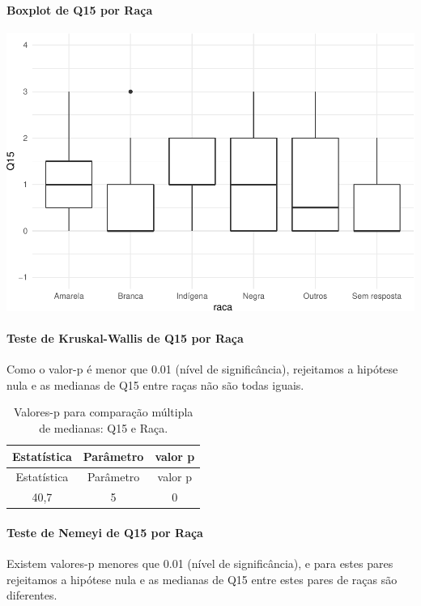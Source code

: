\documentclass[]{article}
\let\oldparagraph\paragraph
\renewcommand{\paragraph}[1]{\oldparagraph{#1}\mbox{}}
\begin{document}
\hypertarget{boxplot-de-q15-por-rauxe7a}{%
\paragraph{Boxplot de Q15 por Raça}\label{boxplot-de-q15-por-rauxe7a}}

\begin{center}\includegraphics[width=0.75\linewidth]{relatorio_covid19_files/figure-latex/unnamed-chunk-107-1} \end{center}

\hypertarget{teste-de-kruskal-wallis-de-q15-por-rauxe7a}{%
\paragraph{Teste de Kruskal-Wallis de Q15 por Raça}\label{teste-de-kruskal-wallis-de-q15-por-rauxe7a}}

Como o valor-p é menor que 0.01 (nível de significância), rejeitamos a hipótese nula e as medianas de Q15 entre raças não são todas iguais.

\begin{longtable}[]{@{}ccc@{}}
\caption{\label{tab:unnamed-chunk-109}Valores-p para comparação múltipla de medianas: Q15 e Raça.}\tabularnewline
\toprule
Estatística & Parâmetro & valor p\tabularnewline
\midrule
\endfirsthead
\toprule
Estatística & Parâmetro & valor p\tabularnewline
\midrule
\endhead
40,7 & 5 & 0\tabularnewline
\bottomrule
\end{longtable}

\hypertarget{teste-de-nemeyi-de-q15-por-rauxe7a}{%
\paragraph{Teste de Nemeyi de Q15 por Raça}\label{teste-de-nemeyi-de-q15-por-rauxe7a}}

Existem valores-p menores que 0.01 (nível de significância), e para estes pares rejeitamos a hipótese nula e as medianas de Q15 entre estes pares de raças são diferentes.
\end{document}
